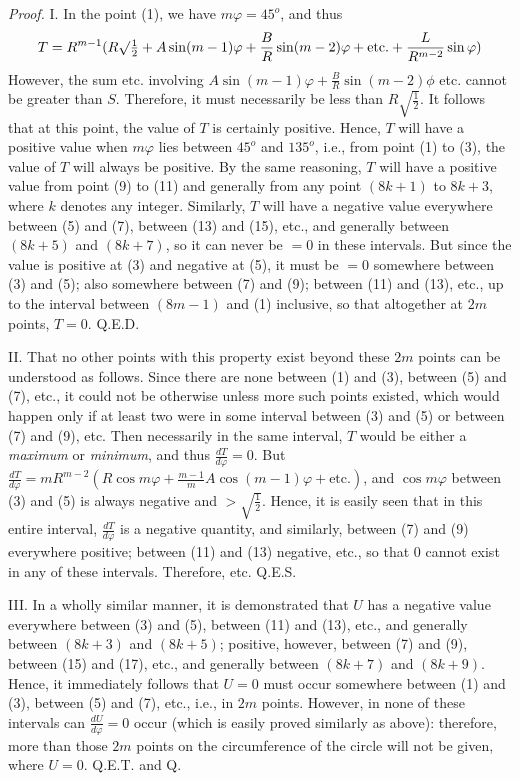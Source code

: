 \documentclass[12pt]{memoir}
\theoremstyle{plain}
\theoremstyle{remark}
\begin{document}
\textit{Proof.} I. In the point (1), we have \(m\varphi = 45^o\), and thus \[ T = R^{m-1}(R\surd \tfrac{1}{2} + A \sin (m-1)\varphi + \frac{B}{R} \sin (m-2) \varphi + \text{etc.}+\frac{L}{R^{m-2}}\sin \varphi )\] However, the sum \(\text{etc.}\) involving \(A \sin (m-1) \varphi + \frac{B}{R} \sin (m-2) \phi \) etc. cannot be greater than \(S\). Therefore, it must necessarily be less than \(R\surd{\tfrac{1}{2}}\). It follows that at this point, the value of \(T\) is certainly positive. Hence, \(T\) will have a positive value when \(m\varphi\) lies between \(45^o\) and \(135^o\), i.e., from point (1) to (3), the value of \(T\) will always be positive. By the same reasoning, \(T\) will have a positive value from point (9) to (11) and generally from any point \((8k+1)\) to \(8k+3\), where \(k\) denotes any integer. Similarly, \(T\) will have a negative value everywhere between (5) and (7), between (13) and (15), etc., and generally between \((8k + 5)\) and \((8k+7)\), so it can never be \(= 0\) in these intervals. But since the value is positive at (3) and negative at (5), it must be \(= 0\) somewhere between (3) and (5); also somewhere between (7) and (9); between (11) and (13), etc., up to the interval between \((8m-1)\) and (1) inclusive, so that altogether at \(2m\) points, \(T = 0\). Q.E.D.

II. That no other points with this property exist beyond these \(2m\) points can be understood as follows. Since there are none between (1) and (3), between (5) and (7), etc., it could not be otherwise unless more such points existed, which would happen only if at least two were in some interval between (3) and (5) or between (7) and (9), etc. Then necessarily in the same interval, \(T\) would be either a \textit{maximum} or \textit{minimum}, and thus \(\frac{dT}{d\varphi} = 0\). But \(\frac{dT}{d\varphi} = mR^{m-2}(R\cos m \varphi + \frac{m-1}{m} A \cos(m-1)\varphi + \text{etc.})\), and \(\cos m\varphi\) between (3) and (5) is always negative and \(>\surd{\tfrac{1}{2}}\). Hence, it is easily seen that in this entire interval, \(\frac{dT}{d\varphi}\) is a negative quantity, and similarly, between (7) and (9) everywhere positive; between (11) and (13) negative, etc., so that \(0\) cannot exist in any of these intervals. Therefore, etc. Q.E.S.

III. In a wholly similar manner, it is demonstrated that \(U\) has a negative value everywhere between (3) and (5), between (11) and (13), etc., and generally between \((8k+3)\) and \((8k+5)\); positive, however, between (7) and (9), between (15) and (17), etc., and generally between \( (8k+7)\) and \((8k+9)\). Hence, it immediately follows that \(U=0\) must occur somewhere between (1) and (3), between (5) and (7), etc., i.e., in \(2m\) points. However, in none of these intervals can \(\frac{dU}{d\varphi}=0\) occur (which is easily proved similarly as above): therefore, more than those \(2m\) points on the circumference of the circle will not be given, where \(U=0\). Q.E.T. and Q.
\end{document}
